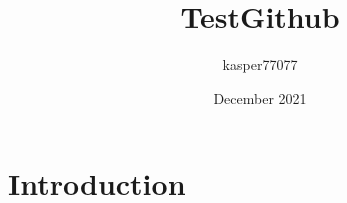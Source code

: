 \documentclass{article}
\title{TestGithub}
\author{kasper77077 }
\date{December 2021}
\begin{document}
\maketitle

\section{Introduction}
\end{document}
